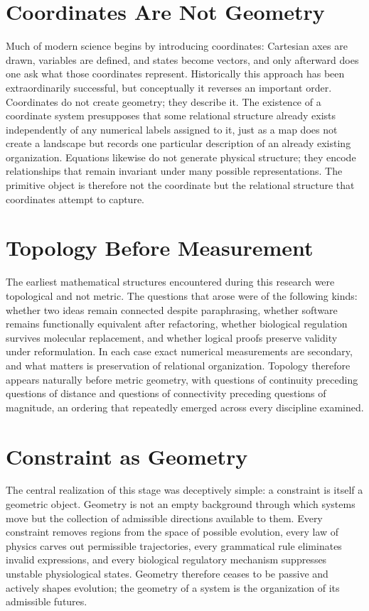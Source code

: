 \documentclass[11pt,oneside]{book}
\numberwithin{equation}{chapter}
\theoremstyle{definition}
\theoremstyle{plain}
\begin{document}
\section{Coordinates Are Not Geometry}

Much of modern science begins by introducing coordinates: Cartesian axes are drawn, variables are defined, and states become vectors, and only afterward does one ask what those coordinates represent. Historically this approach has been extraordinarily successful, but conceptually it reverses an important order. Coordinates do not create geometry; they describe it. The existence of a coordinate system presupposes that some relational structure already exists independently of any numerical labels assigned to it, just as a map does not create a landscape but records one particular description of an already existing organization. Equations likewise do not generate physical structure; they encode relationships that remain invariant under many possible representations. The primitive object is therefore not the coordinate but the relational structure that coordinates attempt to capture.

\section{Topology Before Measurement}

The earliest mathematical structures encountered during this research were topological and not metric. The questions that arose were of the following kinds: whether two ideas remain connected despite paraphrasing, whether software remains functionally equivalent after refactoring, whether biological regulation survives molecular replacement, and whether logical proofs preserve validity under reformulation. In each case exact numerical measurements are secondary, and what matters is preservation of relational organization. Topology therefore appears naturally before metric geometry, with questions of continuity preceding questions of distance and questions of connectivity preceding questions of magnitude, an ordering that repeatedly emerged across every discipline examined.

\section{Constraint as Geometry}

The central realization of this stage was deceptively simple: a constraint is itself a geometric object. Geometry is not an empty background through which systems move but the collection of admissible directions available to them. Every constraint removes regions from the space of possible evolution, every law of physics carves out permissible trajectories, every grammatical rule eliminates invalid expressions, and every biological regulatory mechanism suppresses unstable physiological states. Geometry therefore ceases to be passive and actively shapes evolution; the geometry of a system is the organization of its admissible futures.
\end{document}
